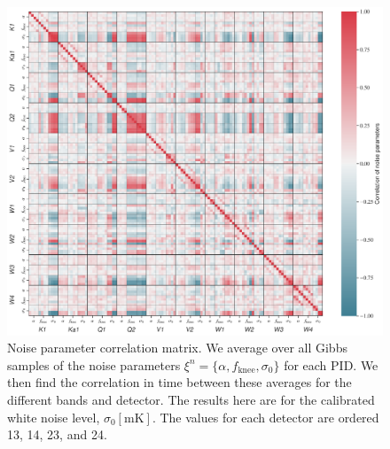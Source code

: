 \documentclass[twocolumn]{../../common/aa}
\begin{document}
\begin{figure}[t]
	\centering
	\includegraphics[width=\textwidth]{figures/noise_parameter_correlation.pdf}
	\caption{Noise parameter correlation matrix. We average over all Gibbs samples of the noise parameters $\xi^n=\{\alpha,f_\mathrm{knee},\sigma_0\}$ for each PID. We then find the correlation in time between these averages for the different bands and detector. The results here are for the calibrated white noise level, $\sigma_0[\mathrm{mK}]$. The values for each detector are ordered 13, 14, 23, and 24.}
	\label{fig:correlation}
\end{figure}
\end{document}
